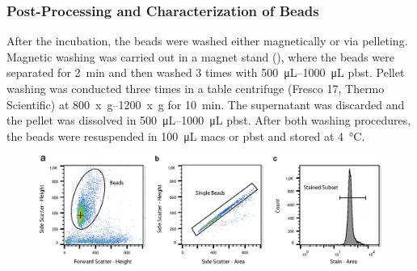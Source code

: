 \subsubsection{Post-Processing and Characterization of Beads}
\label{sec:meth:beadCharact}
After the incubation, the beads were washed either magnetically or via pelleting. Magnetic washing was carried out in a magnet stand (), where the beads were separated for \SI{2}{\minute} and then washed 3 times with \SIrange{500}{1000}{\micro\liter} \gls{pbst}. Pellet washing was conducted three times in a table centrifuge (Fresco 17, Thermo Scientific) at \SIrange{800}{1200}{x g} for \SI{10}{\minute}. The supernatant was discarded and the pellet was dissolved in \SIrange{500}{1000}{\micro\liter} \gls{pbst}. After both washing procedures, the beads were  resuspended in \SI{100}{\micro\liter} \gls{macs} or \gls{pbst} and stored at \SI{4}{\degreeCelsius}.
\begin{figure}[htb!]
	\centering 
	\includegraphics[width=\linewidth] {Ressources/GatingStrategy/GatingStrategy-Layout_with_margin.eps}
	\label{fig:gatingstrategy-layout}
\end{figure}

